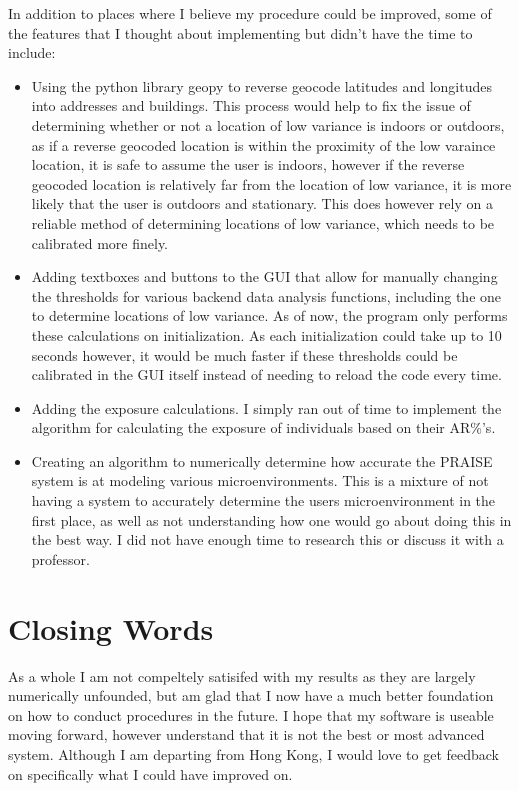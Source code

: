 \documentclass{article}
\begin{document}
\begin{multicols}{2}
In addition to places where I believe my procedure could be improved, some of the features 
that I thought about implementing but didn't have the time to include:
\begin{itemize}
  \item Using the python library geopy to reverse geocode latitudes and longitudes into 
  addresses and buildings. This process would help to fix the issue of determining whether
  or not a location of low variance is indoors or outdoors, as if a reverse geocoded 
  location is within the proximity of the low varaince location, it is safe to assume the 
  user is indoors, however if the reverse geocoded location is relatively far from 
  the location of low variance, it is more likely that the user is outdoors and stationary.
  This does however rely on a reliable method of determining locations of low variance, 
  which needs to be calibrated more finely.
  \item Adding textboxes and buttons to the GUI that allow for manually changing the 
  thresholds for various backend data analysis functions, including the one to determine 
  locations of low variance. As of now, the program only performs these calculations on 
  initialization. As each initialization could take up to 10 seconds however, it would be 
  much faster if these thresholds could be calibrated in the GUI itself instead of needing
  to reload the code every time.
  \item Adding the exposure calculations. I simply ran out of time to implement the 
  algorithm for calculating the exposure of individuals based on their AR\%'s. 
  \item Creating an algorithm to numerically determine how accurate the PRAISE system
  is at modeling various microenvironments. This is a mixture of not having a system to 
  accurately determine the users microenvironment in the first place, as well as not 
  understanding how one would go about doing this in the best way. I did not have enough 
  time to research this or discuss it with a professor.
\end{itemize}

\section{Closing Words}

As a whole I am not compeltely satisifed with my results as they are largely 
numerically unfounded, but am glad that I now 
have a much better foundation on how to conduct procedures in the future. I hope that my 
software is useable moving forward, however understand that it is not the best or 
most advanced system. Although I am departing from Hong Kong, I would love to get feedback
on specifically what I could have improved on.

\end{multicols}
\end{document}
